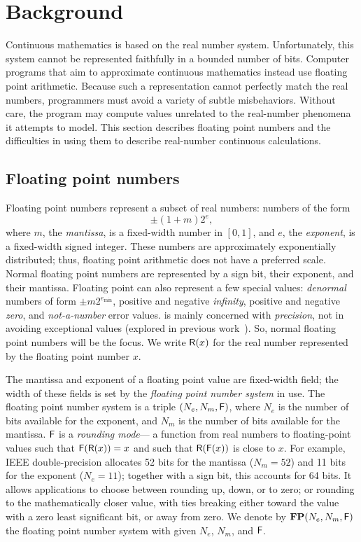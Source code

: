 \documentclass[paper.tex]{subfiles}
\begin{document}
\section{Background}

Continuous mathematics is based on the real number system.
Unfortunately, this system cannot be represented faithfully
  in a bounded number of bits.
Computer programs that aim to approximate continuous mathematics
  instead use floating point arithmetic.
Because such a representation cannot perfectly match the real numbers,
  programmers must avoid a variety of subtle misbehaviors.
Without care, the program may compute values
  unrelated to the real-number phenomena it attempts to model.
This section describes floating point numbers
  and the difficulties in using them to describe
  real-number continuous calculations.

\subsection{Floating point numbers}

Floating point numbers represent a subset of real numbers:
  numbers of the form
\[ \pm (1 + m) 2^e, \]
  where $m$, the \emph{mantissa}, is a fixed-width number in $[0, 1]$,
  and $e$, the \emph{exponent}, is a fixed-width signed integer.
These numbers are approximately exponentially distributed;
  thus, floating point arithmetic does not have a preferred scale.
Normal floating point numbers are represented by
  a sign bit, their exponent, and their mantissa.
Floating point can also represent a few special values:
  \emph{denormal} numbers of form $\pm m 2^{e_{\text{min}}}$,
  positive and negative \emph{infinity}, positive and negative \emph{zero},
  and \emph{not-a-number} error values.
\casio is mainly concerned with \emph{precision},
  not in avoiding exceptional values (explored in previous work~\cite{}).
So, normal floating point numbers will be the focus.
We write $\mathsf{R}(x)$ for the real number represented
  by the floating point number $x$.

The mantissa and exponent of a floating point value
  are fixed-width field; the width of these fields
  is set by the \emph{floating point number system} in use.
The floating point number system is a triple $(N_e, N_m, \mathsf{F})$,
  where $N_e$ is the number of bits available for the exponent,
  and $N_m$ is the number of bits available for the mantissa.
$\mathsf{F}$ is a \emph{rounding mode}---%
  a function from real numbers to floating-point values
  such that $\mathsf{F}(\mathsf{R}(x)) = x$
  and such that $\mathsf{R}(\mathsf{F}(x))$ is close to $x$.
For example, IEEE double-precision allocates
  52 bits for the mantissa ($N_m = 52$)
  and 11 bits for the exponent ($N_e = 11$);
  together with a sign bit, this accounts for 64 bits.
It allows applications to choose between rounding up, down, or to zero;
  or rounding to the mathematically closer value, with ties breaking
  either toward the value with a zero least significant bit,
  or away from zero.
We denote by $\mathbf{FP}(N_e, N_m, \mathsf{F})$
  the floating point number system with given $N_e$, $N_m$, and $\mathsf{F}$.
\end{document}
